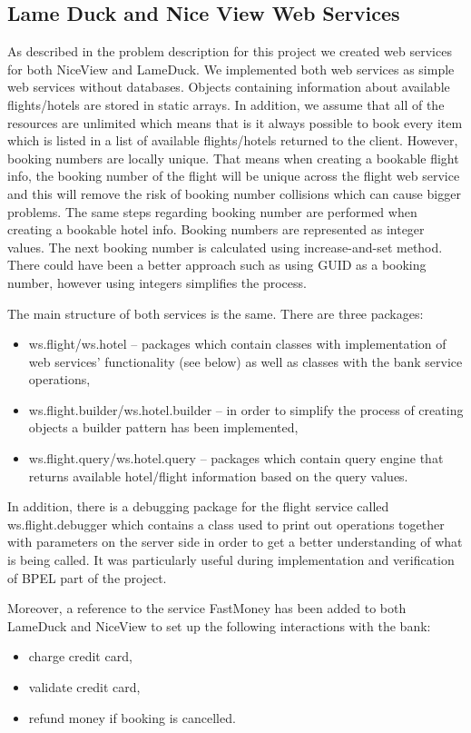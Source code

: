 \subsection{Lame Duck and Nice View Web Services}
As described in the problem description for this project we created web services for both NiceView and LameDuck. We implemented both web services as simple web services without databases. Objects containing information about available flights/hotels are stored in static arrays. In addition, we assume that all of the resources are unlimited which means that is it always possible to book every item which is listed in a list of available flights/hotels returned to the client. However, booking numbers are locally unique. That means when creating a bookable flight info, the booking number of the flight will be unique across the flight web service and this will remove the risk of booking number collisions which can cause bigger problems. The same steps regarding booking number are performed when creating a bookable hotel info. Booking numbers are represented as integer values. The next booking number is calculated using increase-and-set method. There could have been a better approach such as using GUID as a booking number, however using integers simplifies the process.

The main structure of both services is the same. There are three packages:

\begin{itemize}
\item ws.flight/ws.hotel -- packages which contain classes with implementation of web services’ functionality (see below) as well as classes with the bank service operations,
\item ws.flight.builder/ws.hotel.builder -- in order to simplify the process of creating objects a builder pattern has been implemented,
\item ws.flight.query/ws.hotel.query --  packages which contain query engine that returns available hotel/flight information based on the query values.
\end{itemize}
In addition, there is a debugging package for the flight service called ws.flight.debugger which contains a class used to print out operations together with parameters on the server side in order to get a better understanding of what is being called. It was particularly useful during implementation and verification of BPEL part of the project.

Moreover, a reference to the service FastMoney has been added to both LameDuck and NiceView to set up the following interactions with the bank: 
\begin{itemize}
\item charge credit card,
\item validate credit card,
\item refund money if booking is cancelled.
\end{itemize}


